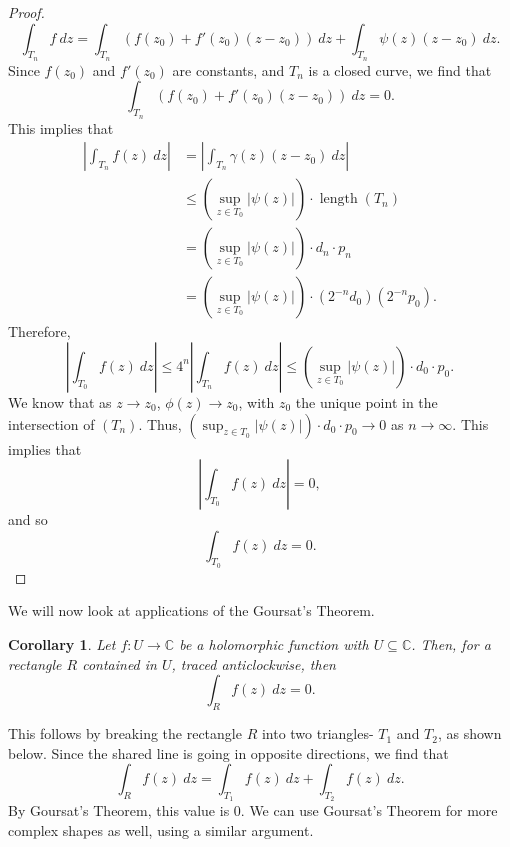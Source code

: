 \documentclass[a4paper, openany]{memoir}
\theoremstyle{definition}
\theoremstyle{plain}
\newtheorem{corollary}[definition]{Corollary}
\begin{document}
\begin{proof}
        \[\int_{T_n} f \ dz = \int_{T_n} (f(z_0) + f'(z_0)(z - z_0)) \ dz + \int_{T_n} \psi(z) (z - z_0) \ dz.\]
        Since $f(z_0)$ and $f'(z_0)$ are constants, and $T_n$ is a closed curve, we find that
        \[\int_{T_n} (f(z_0) + f'(z_0)(z - z_0)) \ dz = 0.\]
        This implies that
        \begin{align*}
            \left|\int_{T_n} f(z) \ dz\right| &= \left|\int_{T_n} \gamma(z) (z - z_0) \ dz\right| \\
            &\leq \left(\sup_{z \in T_0} |\psi(z)| \right) \cdot \operatorname{length} (T_n) \\
            &= \left(\sup_{z \in T_0} |\psi(z)| \right) \cdot d_n \cdot p_n \\
            &= \left(\sup_{z \in T_0} |\psi(z)| \right) \cdot (2^{-n} d_0) (2^{-n} p_0).
        \end{align*}
        Therefore,
        \[\left|\int_{T_0} f(z) \ dz\right| \leq 4^n \left|\int_{T_n} f(z) \ dz\right| \leq \left(\sup_{z \in T_0} |\psi(z)| \right) \cdot d_0 \cdot p_0.\]
        We know that as $z \to z_0$, $\phi(z) \to z_0$, with $z_0$ the unique point in the intersection of $(T_n)$. Thus, $\left(\sup_{z \in T_0} |\psi(z)| \right) \cdot d_0 \cdot p_0 \to 0$ as $n \to \infty$. This implies that
        \[\left|\int_{T_0} f(z) \ dz\right| = 0,\]
        and so
        \[\int_{T_0} f(z) \ dz = 0.\]
    \end{proof}

    We will now look at applications of the Goursat's Theorem. 
    \begin{corollary}
        Let $f \colon U \to \mathbb{C}$ be a holomorphic function with $U \subseteq \mathbb{C}$. Then, for a rectangle $R$ contained in $U$, traced anticlockwise, then 
        \[\int_R f(z) \ dz = 0.\]
    \end{corollary}
    This follows by breaking the rectangle $R$ into two triangles- $T_1$ and $T_2$, as shown below.
    Since the shared line is going in opposite directions, we find that
    \[\int_R f(z) \ dz = \int_{T_1} f(z) \ dz + \int_{T_2} f(z) \ dz.\]
    By Goursat's Theorem, this value is $0$. We can use Goursat's Theorem for more complex shapes as well, using a similar argument.
\end{document}
